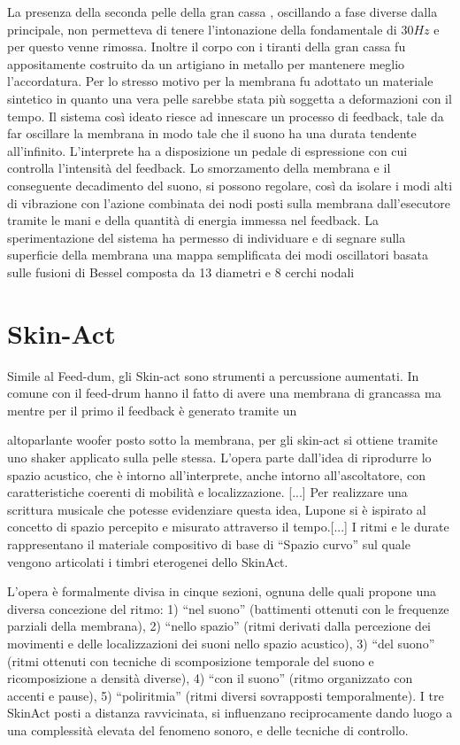 La presenza della seconda pelle della gran cassa , oscillando a fase diverse dalla principale, non permetteva di tenere l’intonazione della fondamentale di $30Hz$ e per questo venne rimossa.
Inoltre il corpo con i tiranti della gran cassa fu appositamente costruito da un artigiano in metallo per mantenere meglio l’accordatura.  
Per lo stresso motivo per la membrana fu adottato  un materiale sintetico in quanto una vera pelle sarebbe stata più soggetta a deformazioni con il tempo. Il sistema così ideato riesce ad innescare un processo di feedback, tale da far oscillare la membrana in modo tale che il suono ha una durata tendente all’infinito.
L’interprete ha a disposizione un pedale di espressione con cui controlla l’intensità del feedback. 
Lo smorzamento della membrana e il conseguente decadimento del suono, si possono regolare, così da isolare i modi alti di vibrazione con l’azione combinata dei nodi posti sulla membrana dall’esecutore tramite le mani e della quantità di energia immessa nel feedback. La sperimentazione del sistema ha permesso di individuare e di segnare sulla superficie della membrana una mappa semplificata dei modi oscillatori basata sulle fusioni di Bessel composta da 13 diametri e 8 cerchi nodali



\section{Skin-Act}

Simile al Feed-dum, gli Skin-act sono strumenti a percussione aumentati. 
In comune con il feed-drum hanno il fatto di avere una membrana di grancassa ma mentre per il primo il feedback è generato tramite un 

altoparlante woofer posto sotto la membrana, per gli skin-act si ottiene tramite uno shaker applicato sulla pelle stessa.
L’opera parte dall’idea di riprodurre lo spazio acustico, che è intorno all’interprete, anche intorno all’ascoltatore, con caratteristiche coerenti di mobilità e localizzazione. [...]
Per realizzare una scrittura musicale che potesse evidenziare questa idea, Lupone si è ispirato al concetto di spazio percepito e misurato attraverso il tempo.[...]
 I ritmi e le durate rappresentano il materiale compositivo di base di “Spazio curvo” sul quale vengono articolati i timbri eterogenei dello SkinAct.


 L’opera è formalmente divisa in cinque sezioni, ognuna delle quali propone una diversa concezione del ritmo: 
1) “nel suono” (battimenti ottenuti con le frequenze parziali della membrana),
2) “nello spazio” (ritmi derivati dalla percezione dei movimenti e delle localizzazioni dei suoni nello spazio acustico),
3) “del suono” (ritmi ottenuti con tecniche di scomposizione temporale del suono e ricomposizione a densità diverse),
4) “con il suono” (ritmo organizzato con accenti e pause),
5) “poliritmia” (ritmi diversi sovrapposti temporalmente).
 I tre SkinAct posti a distanza ravvicinata, si influenzano reciprocamente dando luogo a una complessità elevata del fenomeno sonoro, e delle tecniche di controllo.

